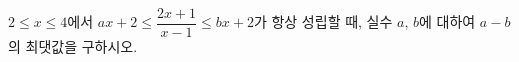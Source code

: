 \hspace*{2mm}\begin{minipage}[t]{\dimexpr\linewidth-2mm\relax}\vspace{0pt}
$2\le x\le 4$에서 $ax+2\le\dfrac{2x+1}{x-1}\le bx+2$가 항상 성립할 때, 실수 $a$, $b$에 대하여 $a-b$의 최댓값을 구하시오.\end{minipage}

